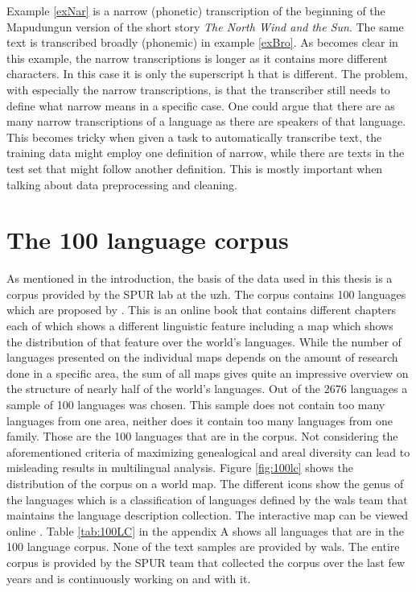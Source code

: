 Example \ref{exNar} is a narrow (phonetic) transcription of the beginning of the Mapudungun version of the short story \textit{The North Wind and the Sun}. The same text is transcribed broadly (phonemic) in example \ref{exBro}. As becomes clear in this example, the narrow transcriptions is longer as it contains more different characters. In this case it is only the superscript h that is different. The problem, with especially the narrow transcriptions, is that the transcriber still needs to define what narrow means in a specific case. One could argue that there are as many narrow transcriptions of a language as there are speakers of that language. This becomes tricky when given a task to automatically transcribe text, the training data might employ one definition of narrow, while there are texts in the test set that might follow another definition. This is mostly important when talking about data preprocessing and cleaning.
  
\section{The 100 language corpus}
\label{corpus}
As mentioned in the introduction, the basis of the data used in this thesis is a corpus provided by the SPUR lab at the \ac{uzh}. The corpus contains 100 languages which are proposed by \citet{Comrie&Dryer.2013}. This is an online book that contains different chapters each of which shows a different linguistic feature including a map which shows the distribution of that feature over the world's languages. While the number of languages presented on the individual maps depends on the amount of research done in a specific area, the sum of all maps gives quite an impressive overview on the structure of nearly half of the world's languages. Out of the 2676 languages a sample of 100 languages was chosen. This sample does not contain too many languages from one area, neither does it contain too many languages from one family. Those are the 100 languages that are in the corpus. Not considering the aforementioned criteria of maximizing genealogical and areal diversity can lead to misleading results in multilingual analysis. Figure \ref{fig:100lc} shows the distribution of the corpus on a world map. The different icons show the genus of the languages which is a classification of languages defined by the \ac{wals} team that maintains the language description collection. The interactive map can be viewed online \citep{100LC.21.07.2021}. Table \ref{tab:100LC} in the appendix A shows all languages that are in the 100 language corpus. None of the text samples are provided by \ac{wals}. The entire corpus is provided by the SPUR team that collected the corpus over the last few years and is continuously working on and with it.

